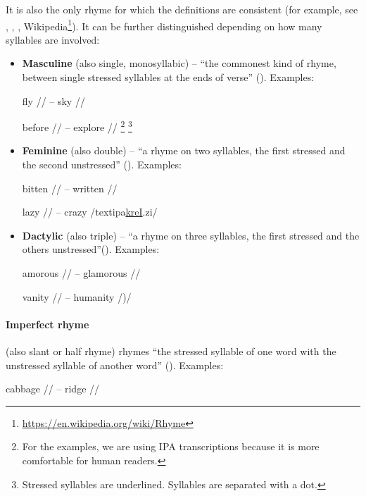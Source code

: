It is also the only rhyme for which the definitions are consistent (for example, see \cite{bain1867manual}, \cite{vanphonological}, \cite{bergman2017litcharts}, Wikipedia\footnote{\url{https://en.wikipedia.org/wiki/Rhyme}}). It can be further distinguished depending on how many syllables are involved:

\begin{itemize}
	\item \textbf{Masculine} (also single, monosyllabic) -- ``the commonest kind of rhyme, between single stressed syllables at the ends of verse'' (\cite{oxforddict2008literary}). 
	Examples: 
	
	fly // -- sky //
	
	before // -- explore //
	\footnote{For the examples, we are using IPA transcriptions because it is more comfortable for human readers.}
	\footnote{Stressed syllables are underlined. Syllables are separated with a dot.}
	
	\item \textbf{Feminine} (also double) -- ``a rhyme on two syllables, the first stressed and the second unstressed'' (\cite{oxforddict2008literary}). Examples: 
	
	bitten // -- written //
	
	lazy // -- crazy /textipa{\underline{kreI}.zi}/
	
	\item \textbf{Dactylic} (also triple) -- ``a rhyme on three syllables, the first stressed and the others unstressed''(\cite{oxforddict2008literary}). Examples: 
	
	amorous // -- glamorous //
	
	vanity // -- humanity /)/
	
\end{itemize}

\paragraph{Imperfect rhyme} (also slant or half rhyme)  rhymes ``the stressed syllable of one word with the unstressed syllable of another word'' (\cite{bergman2017litcharts}). Examples: 

cabbage // -- ridge //


